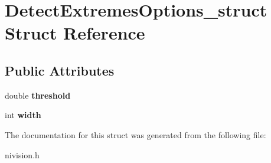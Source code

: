 \hypertarget{structDetectExtremesOptions__struct}{
\section{DetectExtremesOptions\_\-struct Struct Reference}
\label{structDetectExtremesOptions__struct}
}
\subsection*{Public Attributes}
\begin{DoxyCompactItemize}
\item 
\hypertarget{structDetectExtremesOptions__struct_a6becea4841e8e1c664281a6ff9aae4b8}{
double {\bfseries threshold}}
\label{structDetectExtremesOptions__struct_a6becea4841e8e1c664281a6ff9aae4b8}

\item 
\hypertarget{structDetectExtremesOptions__struct_afaffe1e4291d0fe282d69b054a968102}{
int {\bfseries width}}
\label{structDetectExtremesOptions__struct_afaffe1e4291d0fe282d69b054a968102}

\end{DoxyCompactItemize}


The documentation for this struct was generated from the following file:\begin{DoxyCompactItemize}
\item 
nivision.h\end{DoxyCompactItemize}
